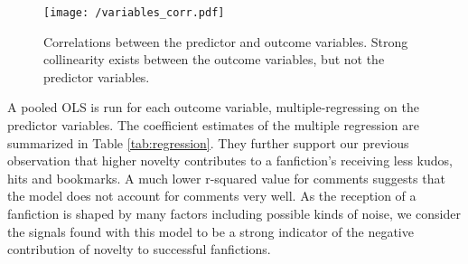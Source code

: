 \documentclass[a4paper]{article}
\begin{document}
\begin{figure}
    \centering
          \texttt{[image: /variables\_corr.pdf]}
        \caption{Correlations between the predictor and outcome variables. Strong collinearity exists between the outcome variables, but not the predictor variables. }
        \label{fig:corr}
\end{figure}

A pooled OLS is run for each outcome variable, multiple-regressing on the predictor variables. The coefficient estimates of the multiple regression are summarized in Table \ref{tab:regression}. They further support our previous observation that higher novelty contributes to a fanfiction's receiving less kudos, hits and bookmarks. A much lower r-squared value for comments suggests that the model does not account for comments very well. As the reception of a fanfiction is shaped by many factors including possible kinds of noise, we consider the signals found with this model to be a strong indicator of the negative contribution of novelty to successful fanfictions.
\end{document}
